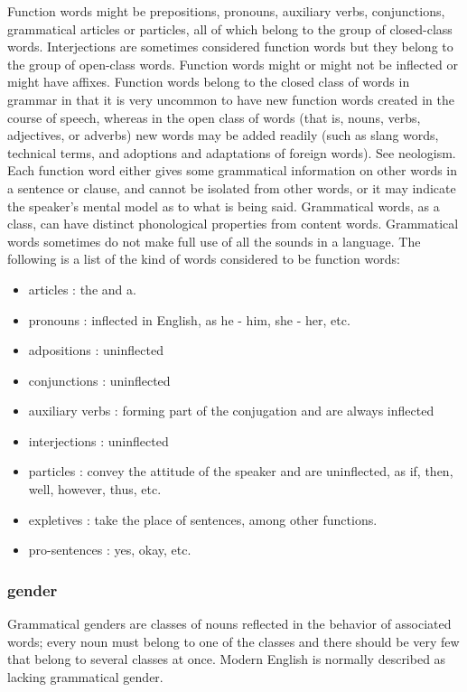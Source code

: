 \begin{small}
Function words might be prepositions, pronouns, auxiliary verbs, conjunctions, grammatical articles or particles, all of which belong to the group of closed-class words. Interjections are sometimes considered function words but they belong to the group of open-class words. Function words might or might not be inflected or might have affixes.  Function words belong to the closed class of words in grammar in that it is very uncommon to have new function words created in the course of speech, whereas in the open class of words (that is, nouns, verbs, adjectives, or adverbs) new words may be added readily (such as slang words, technical terms, and adoptions and adaptations of foreign words). See neologism.  Each function word either gives some grammatical information on other words in a sentence or clause, and cannot be isolated from other words, or it may indicate the speaker's mental model as to what is being said.  Grammatical words, as a class, can have distinct phonological properties from content words. Grammatical words sometimes do not make full use of all the sounds in a language.  The following is a list of the kind of words considered to be function words:
\begin{itemize}
    \item articles : the and a.
    \item pronouns : inflected in English, as he - him, she - her, etc.
    \item adpositions : uninflected
    \item conjunctions : uninflected
    \item auxiliary verbs : forming part of the conjugation and are always inflected
    \item interjections  : uninflected
    \item particles : convey the attitude of the speaker and are uninflected, as if, then, well, however, thus, etc.
    \item expletives : take the place of sentences, among other functions.
    \item pro-sentences : yes, okay, etc.
\end{itemize}

\subsubsection{gender}
 Grammatical genders are classes of nouns reflected in the behavior of associated words; every noun must belong to one of the classes and there should be very few that belong to several classes at once.  Modern English is normally described as lacking grammatical gender.


\end{small}
